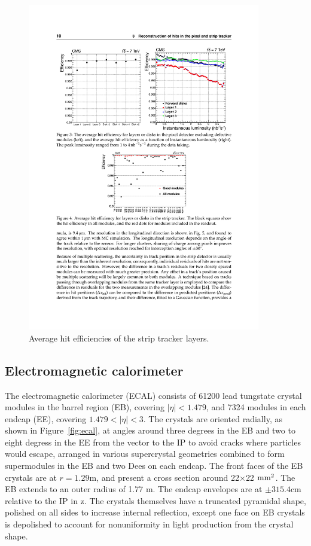 \begin{figure}[tbh]
\centering
\includegraphics[width=4in]{figures/stripeff.pdf}
\caption{Average hit efficiencies of the strip tracker layers.}
\label{fig:stripeff}
\end{figure}

\subsection{Electromagnetic calorimeter}

The electromagnetic calorimeter (ECAL) consists of 61200 lead tungstate crystal modules in the barrel region (EB), covering $|\eta|<1.479$, and 7324 modules in each endcap (EE), covering $1.479<|\eta|<3$. The crystals are oriented radially, as shown in Figure~\ref{fig:ecal}, at angles around three degrees in the EB and two to eight degress in the EE from the vector to the IP to avoid cracks where particles would escape, arranged in various supercrystal geometries combined to form supermodules in the EB and two Dees on each endcap. The front faces of the EB crystals are at $r=1.29$m, and present a cross section around 22$\times$22 $\rm{mm}^2$. The EB extends to an outer radius of 1.77 m. The endcap envelopes are at $\pm315.4$cm relative to the IP in z. The crystals themselves have a truncated pyramidal shape, polished on all sides to increase internal reflection, except one face on EB crystals is depolished to account for nonuniformity in light production from the crystal shape. 

